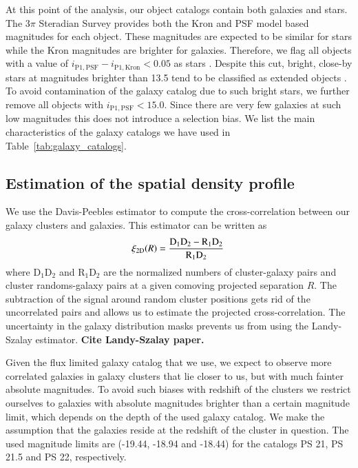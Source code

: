 \documentclass[iop, apjl, twocolappendix, numberedappendix]{emulateapj}
\begin{document}
At this point of the analysis, our object catalogs contain both
galaxies and stars. The 3$\pi$ Steradian Survey provides both the
Kron and PSF model based magnitudes for each object. These
magnitudes are expected to be similar for stars while the Kron
magnitudes are brighter for galaxies. Therefore, we flag all objects
with a value of $i_{\mathrm{P1,PSF}} - i_{\mathrm{P1,Kron}}< 0.05$
as stars \citep{farrow2013pan}. Despite this cut, bright, close-by
stars at magnitudes brighter than 13.5 tend to be classified as
extended objects \citep{chambers2016pan}. To avoid contamination of
the galaxy catalog due to such bright stars, we further remove all
objects with $i_{\mathrm{P1,PSF}} < 15.0$. Since there are very few
galaxies at such low magnitudes this does not introduce a selection
bias. We list the main characteristics of the galaxy catalogs we
have used in Table~\ref{tab:galaxy_catalogs}.

\subsection{Estimation of the spatial density profile}
\label{sec:estimators}

We use the Davis-Peebles estimator \citep{davis1983survey} to
compute the cross-correlation between our galaxy clusters and
galaxies. This estimator can be written as
\begin{equation}
\xi_{\rm 2D}(R) = \frac{\rm D_1D_2-R_1D_2}{\rm R_1D_2}\,
\end{equation}
where D$_1$D$_2$ and R$_1$D$_2$ are the normalized numbers of
cluster-galaxy pairs and cluster randoms-galaxy pairs at a given
comoving projected separation $R$. The subtraction of the signal
around random cluster positions gets rid of the uncorrelated pairs and allows
us to estimate the projected cross-correlation. The uncertainty in the galaxy
distribution masks prevents us from using the Landy-Szalay estimator. {\bf Cite
Landy-Szalay paper.}

Given the flux limited galaxy catalog that we use, we expect to
observe more correlated galaxies in galaxy clusters that lie closer
to us, but with much fainter absolute magnitudes. To avoid
such biases with redshift of the clusters we restrict ourselves to
galaxies with absolute magnitudes brighter than a certain magnitude
limit, which depends on the depth of the used galaxy catalog. We
make the assumption that the galaxies reside at the redshift of the
cluster in question. The used magnitude limits are (-19.44, -18.94
and -18.44) for the catalogs PS 21, PS 21.5 and PS 22, respectively.
\end{document}
